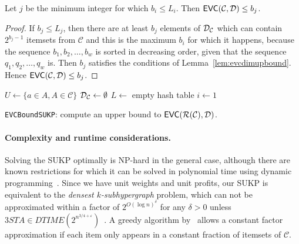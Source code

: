 \begin{lemma}\label{lem:sukpevc}
  Let $j$ be the minimum integer for which $b_i\le L_i$. Then
  $\mathsf{EVC}(\mathcal{C},{\cal D})\le b_j$.
\end{lemma}
\begin{proof}
  If $b_j\le L_j$, then there are at least $b_j$ elements of ${\cal D}_\mathcal{C}$
  which can contain $2^{b_j-1}$ itemsets from $\mathcal{C}$ and this is the
  maximum $b_i$ for which it happens, because the sequence $b_1,b_2,\dotsc,b_w$
  is sorted in decreasing order, given that the sequence $q_1,q_2,\dotsc,q_w$
  is. Then $b_j$ satisfies the conditions of Lemma~\ref{lem:evcdimupbound}.
  Hence $\mathsf{EVC}(\mathcal{C},{\cal D})\le b_j$.
\end{proof}

\begin{algorithm}[htbp]
  \DontPrintSemicolon
  $U\leftarrow\{a\in A, A\in\mathcal{C}\}$\;
  ${\cal D}_\mathcal{C}\leftarrow\emptyset$\;
  $L\leftarrow$ empty hash table\;
  $i\leftarrow 1$\;
  \;
  \caption{\texttt{EVCBoundSUKP}: compute an upper bound to
  $\mathsf{EVC}(\mathcal{R}(\mathcal{C}),{\cal D})$.}
  \label{alg:evcboundsukp}
\end{algorithm}

\paragraph{Complexity and runtime considerations.} Solving the SUKP optimally
is NP-hard in the general case, although there are known restrictions for which
it can be solved in polynomial time using dynamic
programming~\citep{GoldschmidtNY94}. Since we have unit weights and unit
profits, our SUKP is equivalent to the \emph{densest $k$-subhypergraph} problem,
which can not be approximated within a factor of $2^{O(\log n)^\delta}$ for any
$\delta>0$ unless $3STA \in
DTIME(2^{n^{3/4+\varepsilon}})$~\citep{HajiaghayiJKLMRSV06}. A greedy algorithm
by~\citet{Arulselvan14} allows a constant factor approximation if each item only
appears in a constant fraction of itemsets of $\mathcal{C}$.

